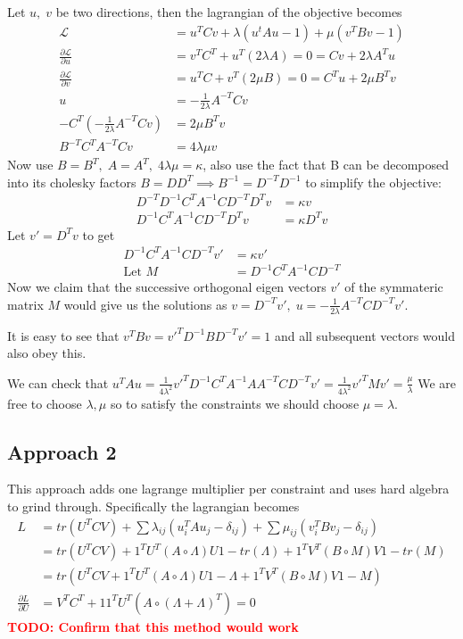 \documentclass[11pt]{article}
\newcommand{\Mu}{M}
\newcommand{\hp}{\circ}
\newcommand{\todo}[1]{\textbf{\textcolor{red}{TODO: #1}}}
\begin{document}
Let $u,\; v$ be two directions, then the lagrangian of the objective
becomes
\begin{align}
  \mathcal{L} &=u^TCv + \lambda (u^tAu-1 ) + \mu (v^TBv-1)\\
  \frac{\partial \mathcal{L}}{\partial u} &= v^TC^T + u^T(2\lambda A)  =0 = Cv + 2\lambda A^Tu\\
  \frac{\partial \mathcal{L}}{\partial v} &= u^TC + v^T(2\mu B)  =0=C^Tu+2\mu B^T v\\
  u &= -\frac{1}{2\lambda}A^{-T}Cv\\
  -C^T (-\frac{1}{2\lambda}A^{-T}Cv) &= 2\mu B^Tv\\
  B^{-T}C^TA^{-T}Cv &=4\lambda \mu v
\end{align}
Now use $B=B^T,\; A=A^T,\; 4\lambda \mu = \kappa$, also use the fact that B can be decomposed
into its cholesky factors $B=DD^T \implies B^{-1}=D^{-T}D^{-1}$ to simplify the objective:
\begin{align}
  D^{-T}D^{-1}C^TA^{-1}CD^{-T}D^Tv &=\kappa v  \\
  D^{-1}C^TA^{-1}CD^{-T}D^Tv &=\kappa D^Tv  
\end{align}
Let $v'=D^Tv$ to get
\begin{align}
  D^{-1}C^TA^{-1}CD^{-T}v' &=\kappa v'  \\
  \text{Let } M &= D^{-1}C^TA^{-1}CD^{-T}
\end{align}
Now we claim that the successive orthogonal eigen vectors $v'$ of the
symmateric matrix $M$ would give us the
solutions as $v=D^{-T}v', \; u = -\frac{1}{2\lambda}A^{-T}CD^{-T}v'$.

It is easy to see that $v^TBv = v'^T D^{-1}BD^{-T}v' = 1$ and all
subsequent vectors would also obey this.

We can check that $u^TAu =
\frac{1}{4\lambda^2}v'^TD^{-1}C^TA^{-1}AA^{-T}CD^{-T}v' =
\frac{1}{4\lambda^2}v'^TMv'=\frac{\mu}{\lambda}$
We are free to choose $\lambda, \mu$ so to satisfy the constraints we
should choose $\mu=\lambda$.
\subsection{Approach 2}
This approach adds one lagrange multiplier per constraint
and uses hard algebra to grind through. Specifically the lagrangian becomes
\begin{align}
  L &= tr(U^TCV) + \sum \lambda_{ij}(u_i^TAu_j - \delta_{ij}) + \sum
  \mu_{ij}(v_i^TBv_j - \delta_{ij})\\
  &= tr(U^TCV) + 1^T U^T(A\hp \Lambda)U 1 - tr(\Lambda) + 1^T V^T(B\hp \Mu)V 1 - tr(\Mu) \\
  &= tr(U^TCV + 1^T U^T(A\hp \Lambda)U 1 - \Lambda + 1^T V^T(B\hp  \Mu)V 1 - \Mu)\\
  \frac{\partial L}{\partial U}&= V^TC^T + 11^TU^T(A\hp (\Lambda + \Lambda)^T) = 0
\end{align}
\todo{Confirm that this method would work}
\end{document}
